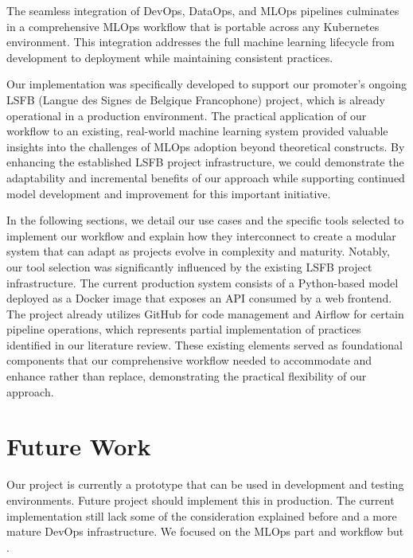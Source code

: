 The seamless integration of DevOps, DataOps, and MLOps pipelines culminates in a comprehensive MLOps workflow that is portable across any Kubernetes environment.
This integration addresses the full machine learning lifecycle from development to deployment while maintaining consistent practices. %

Our implementation was specifically developed to support our promoter's ongoing LSFB (Langue des Signes de Belgique Francophone) project, which is already operational in a production environment.
The practical application of our workflow to an existing, real-world machine learning system provided valuable insights into the challenges of MLOps adoption beyond theoretical constructs.
By enhancing the established LSFB project infrastructure, we could demonstrate the adaptability and incremental benefits of our approach while supporting continued model development and improvement for this important initiative.

In the following sections, we detail our use cases and the specific tools selected to implement our workflow and explain how they interconnect to create a modular system that can adapt as projects evolve in complexity and maturity.
Notably, our tool selection was significantly influenced by the existing LSFB project infrastructure.
The current production system consists of a Python-based model deployed as a Docker image that exposes an API consumed by a web frontend.
The project already utilizes GitHub for code management and Airflow for certain pipeline operations, which represents partial implementation of practices identified in our literature review.
These existing elements served as foundational components that our comprehensive workflow needed to accommodate and enhance rather than replace, demonstrating the practical flexibility of our approach.







\section{Future Work}\label{sec:future-work}
Our project is currently a prototype that can be used in development and testing environments.
Future project should implement this in production.
The current implementation still lack some of the consideration explained before and a more mature DevOps infrastructure.
We focused on the MLOps part and workflow but .

